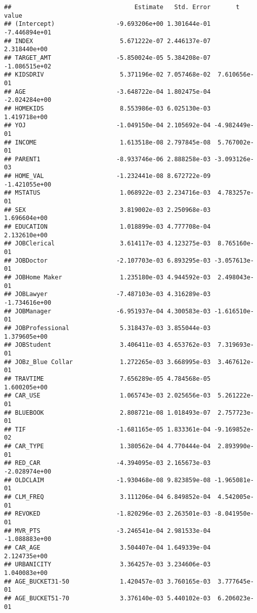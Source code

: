 \documentclass[
]{article}
\begin{document}
\begin{verbatim}
##                                  Estimate   Std. Error       t value
## (Intercept)                 -9.693206e+00 1.301644e-01 -7.446894e+01
## INDEX                        5.671222e-07 2.446137e-07  2.318440e+00
## TARGET_AMT                  -5.850024e-05 5.384208e-07 -1.086515e+02
## KIDSDRIV                     5.371196e-02 7.057468e-02  7.610656e-01
## AGE                         -3.648722e-04 1.802475e-04 -2.024284e+00
## HOMEKIDS                     8.553986e-03 6.025130e-03  1.419718e+00
## YOJ                         -1.049150e-04 2.105692e-04 -4.982449e-01
## INCOME                       1.613518e-08 2.797845e-08  5.767002e-01
## PARENT1                     -8.933746e-06 2.888258e-03 -3.093126e-03
## HOME_VAL                    -1.232441e-08 8.672722e-09 -1.421055e+00
## MSTATUS                      1.068922e-03 2.234716e-03  4.783257e-01
## SEX                          3.819002e-03 2.250968e-03  1.696604e+00
## EDUCATION                    1.018899e-03 4.777708e-04  2.132610e+00
## JOBClerical                  3.614117e-03 4.123275e-03  8.765160e-01
## JOBDoctor                   -2.107703e-03 6.893295e-03 -3.057613e-01
## JOBHome Maker                1.235180e-03 4.944592e-03  2.498043e-01
## JOBLawyer                   -7.487103e-03 4.316289e-03 -1.734616e+00
## JOBManager                  -6.951937e-04 4.300583e-03 -1.616510e-01
## JOBProfessional              5.318437e-03 3.855044e-03  1.379605e+00
## JOBStudent                   3.406411e-03 4.653762e-03  7.319693e-01
## JOBz_Blue Collar             1.272265e-03 3.668995e-03  3.467612e-01
## TRAVTIME                     7.656289e-05 4.784568e-05  1.600205e+00
## CAR_USE                      1.065743e-03 2.025656e-03  5.261222e-01
## BLUEBOOK                     2.808721e-08 1.018493e-07  2.757723e-01
## TIF                         -1.681165e-05 1.833361e-04 -9.169852e-02
## CAR_TYPE                     1.380562e-04 4.770444e-04  2.893990e-01
## RED_CAR                     -4.394095e-03 2.165673e-03 -2.028974e+00
## OLDCLAIM                    -1.930468e-08 9.823859e-08 -1.965081e-01
## CLM_FREQ                     3.111206e-04 6.849852e-04  4.542005e-01
## REVOKED                     -1.820296e-03 2.263501e-03 -8.041950e-01
## MVR_PTS                     -3.246541e-04 2.981533e-04 -1.088883e+00
## CAR_AGE                      3.504407e-04 1.649339e-04  2.124735e+00
## URBANICITY                   3.364257e-03 3.234606e-03  1.040083e+00
## AGE_BUCKET31-50              1.420457e-03 3.760165e-03  3.777645e-01
## AGE_BUCKET51-70              3.376140e-03 5.440102e-03  6.206023e-01

\end{verbatim}
\end{document}
